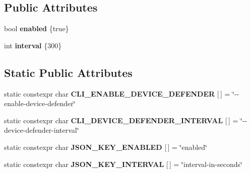 \subsection*{Public Attributes}
\begin{DoxyCompactItemize}
\item 
\mbox{\label{struct_aws_1_1_iot_1_1_device_client_1_1_plain_config_1_1_device_defender_ad1be4257e9cabc30f3d328fd5a968099}} 
bool {\bfseries enabled} \{true\}
\item 
\mbox{\label{struct_aws_1_1_iot_1_1_device_client_1_1_plain_config_1_1_device_defender_a1407a25d4b3bacbd0578339eb0847db0}} 
int {\bfseries interval} \{300\}
\end{DoxyCompactItemize}
\subsection*{Static Public Attributes}
\begin{DoxyCompactItemize}
\item 
\mbox{\label{struct_aws_1_1_iot_1_1_device_client_1_1_plain_config_1_1_device_defender_a61696ee467defb358e58621a16eb7b07}} 
static constexpr char {\bfseries C\+L\+I\+\_\+\+E\+N\+A\+B\+L\+E\+\_\+\+D\+E\+V\+I\+C\+E\+\_\+\+D\+E\+F\+E\+N\+D\+ER} \mbox{[}$\,$\mbox{]} = \char`\"{}-\/-\/enable-\/device-\/defender\char`\"{}
\item 
\mbox{\label{struct_aws_1_1_iot_1_1_device_client_1_1_plain_config_1_1_device_defender_a4e7ed3859ac73100a22e4d89bf540f8d}} 
static constexpr char {\bfseries C\+L\+I\+\_\+\+D\+E\+V\+I\+C\+E\+\_\+\+D\+E\+F\+E\+N\+D\+E\+R\+\_\+\+I\+N\+T\+E\+R\+V\+AL} \mbox{[}$\,$\mbox{]} = \char`\"{}-\/-\/device-\/defender-\/interval\char`\"{}
\item 
\mbox{\label{struct_aws_1_1_iot_1_1_device_client_1_1_plain_config_1_1_device_defender_af35ebcc9d16004b8aaadf5405b0213a4}} 
static constexpr char {\bfseries J\+S\+O\+N\+\_\+\+K\+E\+Y\+\_\+\+E\+N\+A\+B\+L\+ED} \mbox{[}$\,$\mbox{]} = \char`\"{}enabled\char`\"{}
\item 
\mbox{\label{struct_aws_1_1_iot_1_1_device_client_1_1_plain_config_1_1_device_defender_a19b3d056cf398072d11484499ba36f59}} 
static constexpr char {\bfseries J\+S\+O\+N\+\_\+\+K\+E\+Y\+\_\+\+I\+N\+T\+E\+R\+V\+AL} \mbox{[}$\,$\mbox{]} = \char`\"{}interval-\/in-\/seconds\char`\"{}
\end{DoxyCompactItemize}


